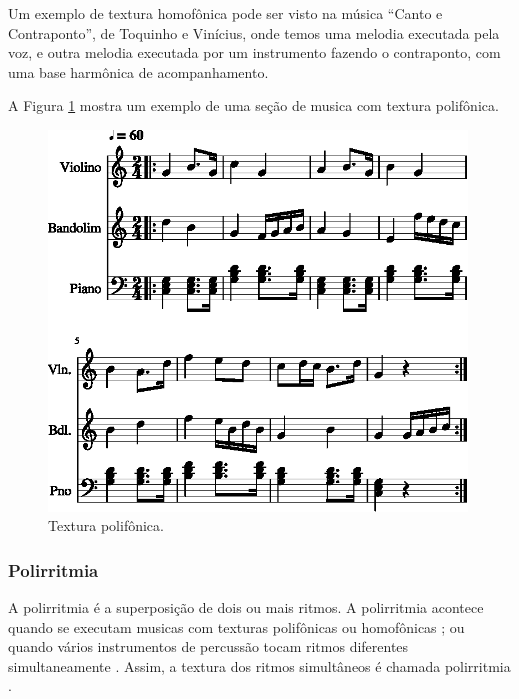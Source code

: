 \begin{example}
Um exemplo de textura homofônica pode ser visto na música ``Canto e Contraponto'',
de Toquinho e Vinícius, 
onde temos uma melodia executada pela voz, e outra melodia executada por um instrumento fazendo o contraponto, 
com uma base harmônica de acompanhamento.
\end{example}

\begin{example}
A Figura \ref{fig:ex:polifonica} mostra um exemplo de uma seção de musica com textura polifônica.
\end{example}

\begin{figure}[!h]
\centering
    \includegraphics[width=0.99\textwidth]{chapters/cap-musicalidade-percepcion/textura-polifonica-1.eps}
  \caption{Textura polifônica.}
\label{fig:ex:polifonica}
\end{figure}




\subsubsection{Polirritmia}
\label{subsec:polirritmia}
A polirritmia é a superposição de dois ou mais ritmos.
A polirritmia acontece quando se executam musicas com texturas polifônicas ou homofônicas
\cite[pp. 93]{alves2004teoria};
ou quando vários instrumentos de percussão tocam ritmos diferentes simultaneamente \cite[pp. 35]{holland2013music}.
Assim, a textura dos ritmos simultâneos é chamada polirritmia \cite[pp. 35]{holland2013music}.

